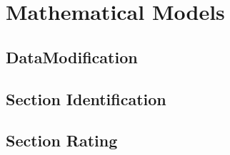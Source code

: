 \chapter{Mathematical Models}

\section{DataModification}

\section{Section Identification}

\section{Section Rating}